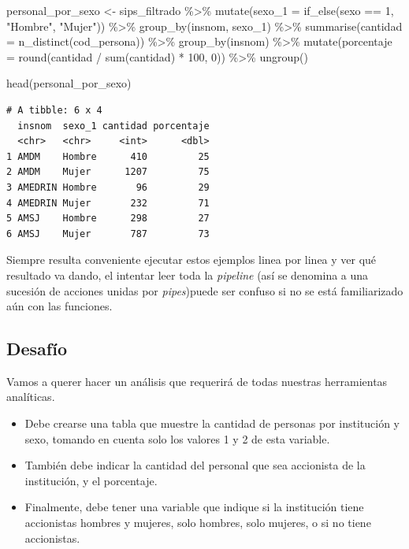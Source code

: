 \documentclass[
  letterpaper,
  DIV=11,
  numbers=noendperiod]{scrreprt}
\newenvironment{Shaded}{\begin{snugshade}}{\end{snugshade}}
\newcommand{\AttributeTok}[1]{\textcolor[rgb]{0.40,0.45,0.13}{#1}}
\newcommand{\DecValTok}[1]{\textcolor[rgb]{0.68,0.00,0.00}{#1}}
\newcommand{\FunctionTok}[1]{\textcolor[rgb]{0.28,0.35,0.67}{#1}}
\newcommand{\NormalTok}[1]{\textcolor[rgb]{0.00,0.23,0.31}{#1}}
\newcommand{\OtherTok}[1]{\textcolor[rgb]{0.00,0.23,0.31}{#1}}
\newcommand{\SpecialCharTok}[1]{\textcolor[rgb]{0.37,0.37,0.37}{#1}}
\newcommand{\StringTok}[1]{\textcolor[rgb]{0.13,0.47,0.30}{#1}}
\begin{document}
\begin{Shaded}
\begin{Highlighting}[]
\NormalTok{personal\_por\_sexo }\OtherTok{\textless{}{-}}\NormalTok{ sips\_filtrado }\SpecialCharTok{\%\textgreater{}\%} 
  \FunctionTok{mutate}\NormalTok{(}\AttributeTok{sexo\_1 =} \FunctionTok{if\_else}\NormalTok{(sexo }\SpecialCharTok{==} \DecValTok{1}\NormalTok{, }\StringTok{"Hombre"}\NormalTok{, }\StringTok{"Mujer"}\NormalTok{)) }\SpecialCharTok{\%\textgreater{}\%} 
  \FunctionTok{group\_by}\NormalTok{(insnom, sexo\_1) }\SpecialCharTok{\%\textgreater{}\%} 
  \FunctionTok{summarise}\NormalTok{(}\AttributeTok{cantidad =} \FunctionTok{n\_distinct}\NormalTok{(cod\_persona)) }\SpecialCharTok{\%\textgreater{}\%} 
  \FunctionTok{group\_by}\NormalTok{(insnom) }\SpecialCharTok{\%\textgreater{}\%} 
  \FunctionTok{mutate}\NormalTok{(}\AttributeTok{porcentaje =} \FunctionTok{round}\NormalTok{(cantidad }\SpecialCharTok{/} \FunctionTok{sum}\NormalTok{(cantidad) }\SpecialCharTok{*} \DecValTok{100}\NormalTok{, }\DecValTok{0}\NormalTok{)) }\SpecialCharTok{\%\textgreater{}\%} 
  \FunctionTok{ungroup}\NormalTok{()}

\FunctionTok{head}\NormalTok{(personal\_por\_sexo)}
\end{Highlighting}
\end{Shaded}

\begin{verbatim}
# A tibble: 6 x 4
  insnom  sexo_1 cantidad porcentaje
  <chr>   <chr>     <int>      <dbl>
1 AMDM    Hombre      410         25
2 AMDM    Mujer      1207         75
3 AMEDRIN Hombre       96         29
4 AMEDRIN Mujer       232         71
5 AMSJ    Hombre      298         27
6 AMSJ    Mujer       787         73
\end{verbatim}

Siempre resulta conveniente ejecutar estos ejemplos linea por linea y
ver qué resultado va dando, el intentar leer toda la \emph{pipeline}
(así se denomina a una sucesión de acciones unidas por
\emph{pipes})puede ser confuso si no se está familiarizado aún con las
funciones.

\hypertarget{desafuxedo}{%
\subsection{Desafío}\label{desafuxedo}}

Vamos a querer hacer un análisis que requerirá de todas nuestras
herramientas analíticas.

\begin{itemize}
\item
  Debe crearse una tabla que muestre la cantidad de personas por
  institución y sexo, tomando en cuenta solo los valores 1 y 2 de esta
  variable.
\item
  También debe indicar la cantidad del personal que sea accionista de la
  institución, y el porcentaje.
\item
  Finalmente, debe tener una variable que indique si la institución
  tiene accionistas hombres y mujeres, solo hombres, solo mujeres, o si
  no tiene accionistas.
\end{itemize}
\end{document}
